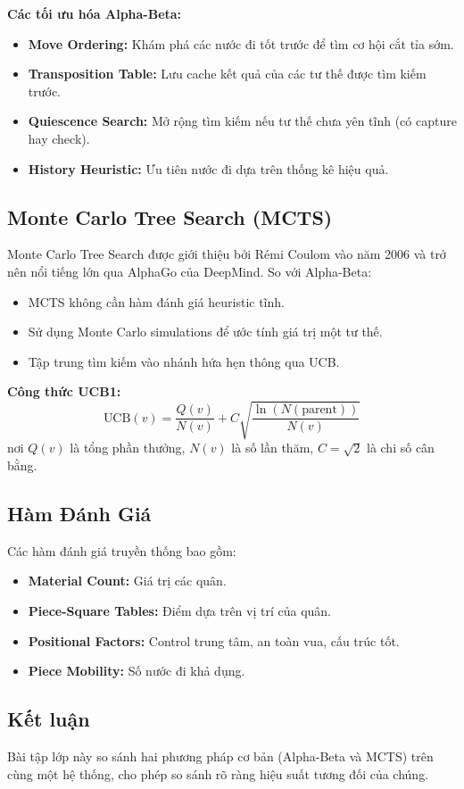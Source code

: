 \textbf{Các tối ưu hóa Alpha-Beta:}
\begin{itemize}
    \item \textbf{Move Ordering:} Khám phá các nước đi tốt trước để tìm cơ hội cắt tỉa sớm.
    \item \textbf{Transposition Table:} Lưu cache kết quả của các tư thế được tìm kiếm trước.
    \item \textbf{Quiescence Search:} Mở rộng tìm kiếm nếu tư thế chưa yên tĩnh (có capture hay check).
    \item \textbf{History Heuristic:} Ưu tiên nước đi dựa trên thống kê hiệu quả.
\end{itemize}

\subsection{Monte Carlo Tree Search (MCTS)}
Monte Carlo Tree Search được giới thiệu bởi Rémi Coulom vào năm 2006 và trở nên nổi tiếng lớn qua AlphaGo của DeepMind. So với Alpha-Beta:
\begin{itemize}
    \item MCTS không cần hàm đánh giá heuristic tĩnh.
    \item Sử dụng Monte Carlo simulations để ước tính giá trị một tư thế.
    \item Tập trung tìm kiếm vào nhánh hứa hẹn thông qua UCB.
\end{itemize}

\textbf{Công thức UCB1:}
$$\text{UCB}(v) = \frac{Q(v)}{N(v)} + C\sqrt{\frac{\ln(N(\text{parent}))}{N(v)}}$$
nơi $Q(v)$ là tổng phần thưởng, $N(v)$ là số lần thăm, $C = \sqrt{2}$ là chi số cân bằng.

\subsection{Hàm Đánh Giá}
Các hàm đánh giá truyền thống bao gồm:
\begin{itemize}
    \item \textbf{Material Count:} Giá trị các quân.
    \item \textbf{Piece-Square Tables:} Điểm dựa trên vị trí của quân.
    \item \textbf{Positional Factors:} Control trung tâm, an toàn vua, cấu trúc tốt.
    \item \textbf{Piece Mobility:} Số nước đi khả dụng.
\end{itemize}

\subsection{Kết luận}
Bài tập lớp này so sánh hai phương pháp cơ bản (Alpha-Beta và MCTS) trên cùng một hệ thống, cho phép so sánh rõ ràng hiệu suất tương đối của chúng.
